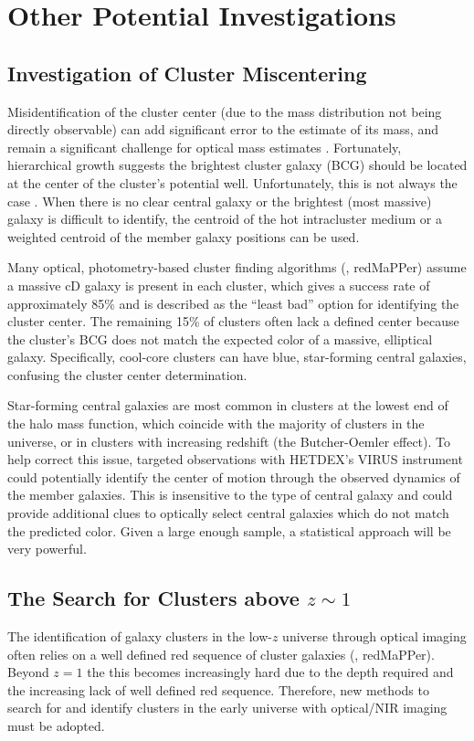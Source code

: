 \section{Other Potential Investigations}\label{sec: future}
\subsection{Investigation of Cluster Miscentering}
Misidentification of the cluster center (due to the mass distribution not being directly observable) can add significant error to the estimate of its mass, and remain a significant challenge for optical mass estimates . Fortunately, hierarchical growth suggests the brightest cluster galaxy (BCG) should be located at the center of the cluster's potential well. Unfortunately, this is not always the case . When there is no clear central galaxy or the brightest (most massive) galaxy is difficult to identify, the centroid of the hot intracluster medium or a weighted centroid of the member galaxy positions  can be used.

Many optical, photometry-based cluster finding algorithms (\eg, redMaPPer) assume a massive cD galaxy is present in each cluster, which gives a success rate of approximately 85\% and is described as the ``least bad'' option for identifying the cluster center. The remaining 15\% of clusters often lack a defined center because the cluster's BCG does not match the expected color of a massive, elliptical galaxy. Specifically, cool-core clusters can have blue, star-forming central galaxies, confusing the cluster center determination.

Star-forming central galaxies are most common in clusters at the lowest end of the halo mass function, which coincide with the majority of clusters in the universe, or in clusters with increasing redshift (the Butcher-Oemler effect). To help correct this issue, targeted observations with HETDEX's VIRUS instrument could potentially identify the center of motion through the observed dynamics of the member galaxies. This is insensitive to the type of central galaxy and could provide additional clues to optically select central galaxies which do not match the predicted color. Given a large enough sample, a statistical approach will be very powerful.

\subsection{The Search for Clusters above $z\sim1$}
The identification of galaxy clusters in the low-$z$ universe through optical imaging often relies on a well defined red sequence of cluster galaxies (\eg, redMaPPer). Beyond $z=1$ the this becomes increasingly hard due to the depth required and the increasing lack of well defined red sequence. Therefore, new methods to search for and identify clusters in the early universe with optical/NIR imaging must be adopted.
 

